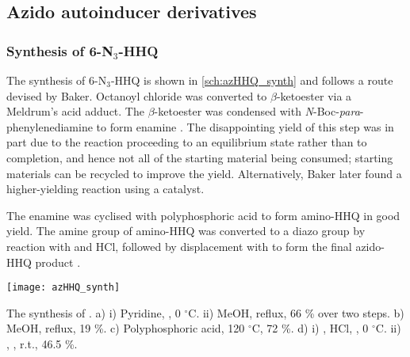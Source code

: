 \subsection{Azido autoinducer derivatives}

\subsubsection{Synthesis of 6-N$_3$-HHQ }

The synthesis of 6-N$_3$-HHQ  is shown in \ref{sch:azHHQ_synth} and follows a route devised by Baker\cite{Baker2015}. Octanoyl chloride  was converted to $\beta$-ketoester  via a Meldrum's acid adduct\cite{Baker2012,Scribner1978}. The $\beta$-ketoester  was condensed with \textit{N}-Boc-\textit{para}-phenylenediamine  to form enamine . The disappointing yield of this step was in part due to the reaction proceeding to an equilibrium state rather than to completion, and hence not all of the starting material being consumed; starting materials can be recycled to improve the yield. Alternatively, Baker later found a higher-yielding reaction using a  catalyst.

The enamine  was cyclised with polyphosphoric acid to form amino-HHQ  in good yield. The amine group of amino-HHQ  was converted to a diazo group by reaction with  and HCl, followed by displacement with  to form the final azido-HHQ product \cite{Xu2013}.

\begin{scheme}[H]
	\begin{center}
		\texttt{[image: azHHQ\_synth]}
		\caption{The synthesis of . 
		a) i) Pyridine, , 0 $^{\circ}$C. ii) MeOH, reflux, 66 \% over two steps. 
		b) MeOH, reflux, 19 \%. 
		c) Polyphosphoric acid, 120 $^{\circ}$C, 72 \%. 
		d) i) , HCl, , 0 $^{\circ}$C. ii) , , r.t., 46.5 \%.
		\label{sch:azHHQ_synth}}
	\end{center}
\end{scheme}

